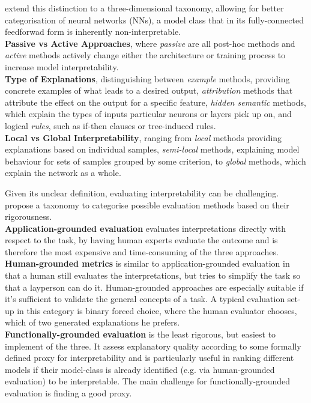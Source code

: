 \documentclass[twoside,11pt]{article}
\begin{document}
\citet[chap. 2]{survey_NN_interpretability} extend this distinction to a three-dimensional taxonomy, allowing for better categorisation of neural networks (NNs),
a model class that in its fully-connected feedforwad form is inherently non-interpretable.\\ %
\textbf{Passive vs Active Approaches}, where \textit{passive} are all post-hoc methods and \textit{active} methods actively change either the architecture or
training process to increase model interpretability.\\
\textbf{Type of Explanations}, distinguishing between \textit{example} methods, providing concrete examples of what leads to a desired output, \textit{attribution}
methods that attribute the effect on the output for a specific feature, \textit{hidden semantic} methods, which explain the types of inputs particular neurons or layers
pick up on, and logical \textit{rules}, such as if-then clauses or tree-induced rules.\\
\textbf{Local vs Global Interpretability}, ranging from \textit{local} methods providing explanations based on individual samples, \textit{semi-local} methods,
explaining model behaviour for sets of samples grouped by some criterion, to \textit{global} methods, which explain the network as a whole.

Given its unclear definition, evaluating interpretability can be challenging. \citet[3]{DoshiVelez2017TowardsAR} propose a taxonomy to categorise
possible evaluation methods based on their rigorousness.\\
\textbf{Application-grounded evaluation} evaluates interpretations directly with respect to the task, by having human experts evaluate the outcome and
is therefore the most expensive and time-consuming of the three approaches.\\
\textbf{Human-grounded metrics} is similar to application-grounded evaluation in that a human still evaluates the interpretations, but tries to simplify the task
so that a layperson can do it. Human-grounded approaches are especially suitable if it's sufficient to validate the general concepts of a task. A typical evaluation
set-up in this category is binary forced choice, where the human evaluator chooses, which of two generated explanations he prefers.\\
\textbf{Functionally-grounded evaluation} is the least rigorous, but easiest to implement of the three. It assess explanatory quality according to some
formally defined proxy for interpretability and is particularly useful in ranking different models if their model-class is already identified
(e.g. via human-grounded evaluation) to be interpretable. The main challenge for functionally-grounded evaluation is finding a good proxy.
\end{document}
